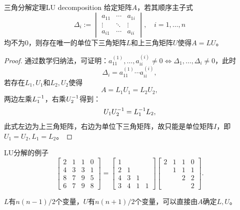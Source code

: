 \begin{theorem}
    {三角分解定理}{LU decomposition}
    给定矩阵$A$，若其顺序主子式
    \begin{equation}
        \Delta_i := \begin{vmatrix}
            a_{11}&\cdots&a_{1i}\\
            \vdots&\ddots&\vdots\\
            a_{i1}&\cdots&a_{ii}
        \end{vmatrix},\quad i = 1,\ldots,n
    \end{equation}
    均不为0，则存在唯一的单位下三角矩阵$L$和上三角矩阵$U$使得$A = LU$。
\end{theorem}
\begin{proof}
    通过数学归纳法，可证明：$a_{11}^{(1)},\ldots,a_{ii}^{(i)} \neq 0 \iff \Delta_1,\ldots,\Delta_i \neq 0$，此时
    \begin{equation}
        \Delta_i = a_{11}^{(1)}\cdots a_{ii}^{(i)},
    \end{equation}
    若存在$L_1,U_1$和$L_2,U_2$使得
    \[
        A = L_1U_1 = L_2U_2,
    \]
    两边左乘$L_1^{-1}$，右乘$U_2^{-1}$得到：
    \[
        U_1U_2^{-1} = L_1^{-1} L_2,
    \]
    此式左边为上三角矩阵，右边为单位下三角矩阵，故只能是单位矩阵$I$，即$U_1 = U_2,L_1 = L_2$。
\end{proof}

\begin{example}
    {LU分解的例子}{}
    \[
        \begin{bmatrix}
            2&1&1&0\\4&3&3&1\\8&7&9&5\\6&7&9&8
        \end{bmatrix} = \begin{bmatrix}
            1\\2&1\\4&3&1\\3&4&1&1
        \end{bmatrix}\begin{bmatrix}
            2&1&1&0\\ &1&1&1\\ &&2&2\\ &&&2
        \end{bmatrix}.
    \]
\end{example}

\begin{remark}
    $L$有$n(n - 1)/2$个变量，$U$有$n(n + 1)/2$个变量，可以直接由$A$确定$L,U$。
\end{remark}

